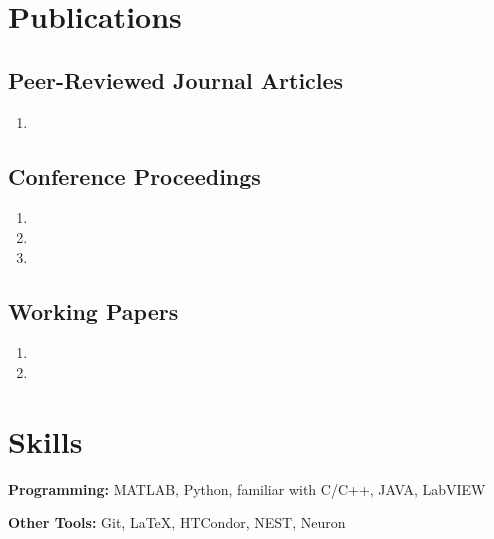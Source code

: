 \documentclass[10pt,letterpaper]{article}
\begin{document}
\vspace{-0.25in}

\section*{Publications}
\vspace{-0.05in}


\subsection*{Peer-Reviewed Journal Articles}

\begin{enumerate}
\item {}
\end{enumerate}

\subsection*{Conference Proceedings}

\begin{enumerate}[resume]
\item {}
\item {}
\item {}
\end{enumerate}

\subsection*{Working Papers}
\begin{enumerate}[resume]
\item {}
\item {}
\end{enumerate}

\vspace{-0.25in}

\section*{Skills}
\vspace{-0.05in}
\hspace{1.5em}\textbf{Programming:} MATLAB, Python, familiar with C/C++, JAVA, LabVIEW

\hspace{1.5em}\textbf{Other Tools:} Git, \LaTeX, HTCondor, NEST, Neuron
\end{document}
